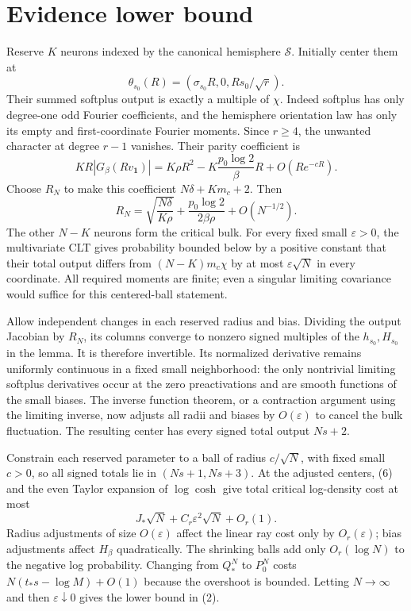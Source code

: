\documentclass[11pt]{article}
\newcommand{\one}{\mathbf1}\newcommand{\relu}{\operatorname{ReLU}}
\begin{document}
\section{Evidence lower bound}
Reserve $K$ neurons indexed by the canonical hemisphere $\mathcal S$.
Initially center them at
\[
 \theta_{s_0}(R)=(\sigma_{s_0}R,0,R s_0/\sqrt r).
\]
Their summed softplus output is exactly a multiple of $\chi$.
Indeed softplus has only degree-one odd Fourier coefficients, and the
hemisphere orientation law has only its empty and first-coordinate
Fourier moments. Since $r\ge4$, the unwanted character at degree
$r-1$ vanishes. Their parity coefficient is
\[
 K R|G_\beta(Rv_{\one})|
  =K\rho R^2-K\frac{p_0\log2}{\beta}R+O(Re^{-cR}).
\]
Choose $R_N$ to make this coefficient $N\delta+Km_c+2$.
Then
\[
 R_N=\sqrt{\frac{N\delta}{K\rho}}+
                \frac{p_0\log2}{2\beta\rho}+O(N^{-1/2}).    \tag{11}
\]
The other $N-K$ neurons form the critical bulk. For every fixed small
$\varepsilon>0$, the multivariate CLT gives probability bounded below
by a positive constant that their total output differs from
$(N-K)m_c\chi$ by at most $\varepsilon\sqrt N$ in every coordinate.
All required moments are finite; even a singular limiting covariance
would suffice for this centered-ball statement.

Allow independent changes in each reserved radius and bias. Dividing
the output Jacobian by $R_N$, its columns converge to nonzero signed
multiples of the $h_{s_0},H_{s_0}$ in the lemma. It is therefore
invertible. Its normalized derivative remains uniformly continuous
in a fixed small neighborhood: the only nontrivial limiting softplus
derivatives occur at the zero preactivations and are smooth functions
of the small biases. The inverse function theorem, or a contraction
argument using the limiting inverse, now adjusts all radii and biases
by $O(\varepsilon)$ to cancel the bulk fluctuation. The resulting
center has every signed total output $Ns+2$.

Constrain each reserved parameter to a ball of radius $c/\sqrt N$,
with fixed small $c>0$, so all signed totals lie in $(Ns+1,Ns+3)$.
At the adjusted centers, (6) and the even Taylor expansion of
$\log\cosh$ give total critical log-density cost at most
\[
 J_*\sqrt N+C_r\varepsilon^2\sqrt N+O_r(1).
\]
Radius adjustments of size $O(\varepsilon)$ affect the linear ray
cost only by $O_r(\varepsilon)$; bias adjustments affect $H_\beta$
quadratically. The shrinking balls add only $O_r(\log N)$ to the
negative log probability. Changing from $Q_*^N$ to $P_0^N$ costs
$N(t_*s-\log M)+O(1)$ because the overshoot is bounded.
Letting $N\to\infty$ and then $\varepsilon\downarrow0$ gives
the lower bound in (2).
\end{document}
